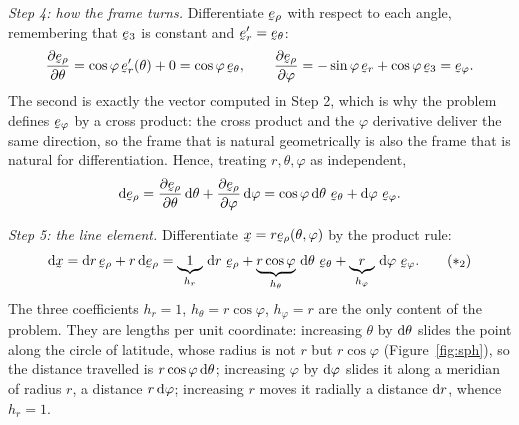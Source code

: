 \begin{solution}
\emph{Step 4: how the frame turns.}
Differentiate $\berho$ with respect to each angle, remembering that
$\be_{3}$ is constant and $\ber'=\beth$:
\[
   \frac{\partial\berho}{\partial\theta}
   =\cos\varphi\,\ber'(\theta)+0=\cos\varphi\,\beth,
   \qquad
   \frac{\partial\berho}{\partial\varphi}
   =-\sin\varphi\,\ber+\cos\varphi\,\be_{3}=\beph .
\]
The second is exactly the vector computed in Step 2, which is why the
problem defines $\beph$ by a cross product: the cross product and the
$\varphi$ derivative deliver the same direction, so the frame that is
natural geometrically is also the frame that is natural for differentiation.
Hence, treating $r,\theta,\varphi$ as independent,
\[
   \dl\berho=\frac{\partial\berho}{\partial\theta}\,\dl\theta
            +\frac{\partial\berho}{\partial\varphi}\,\dl\varphi
            =\cos\varphi\,\dl\theta\ \beth+\dl\varphi\ \beph .
\]

\emph{Step 5: the line element.}
Differentiate $\bx=r\berho(\theta,\varphi)$ by the product rule:
\begin{equation}
   \dl\bx=\dl r\,\berho+r\,\dl\berho
         =\underbrace{1}_{h_{r}}\,\dl r\ \berho
          +\underbrace{r\cos\varphi}_{h_{\theta}}\,\dl\theta\ \beth
          +\underbrace{r}_{h_{\varphi}}\,\dl\varphi\ \beph .
   \tag{$\ast_2$}
\end{equation}
The three coefficients $h_{r}=1$, $h_{\theta}=r\cos\varphi$, $h_{\varphi}=r$
are the only content of the problem. They are lengths per unit coordinate:
increasing $\theta$ by $\mathrm{d}\theta$ slides the point along the circle of
latitude, whose radius is not $r$ but $r\cos\varphi$ (Figure~\ref{fig:sph}),
so the distance travelled is $r\cos\varphi\,\mathrm{d}\theta$; increasing $\varphi$
by $\mathrm{d}\varphi$ slides it along a meridian of radius $r$, a distance
$r\,\mathrm{d}\varphi$; increasing $r$ moves it radially a distance $\mathrm{d} r$,
whence $h_{r}=1$.


\end{solution}
